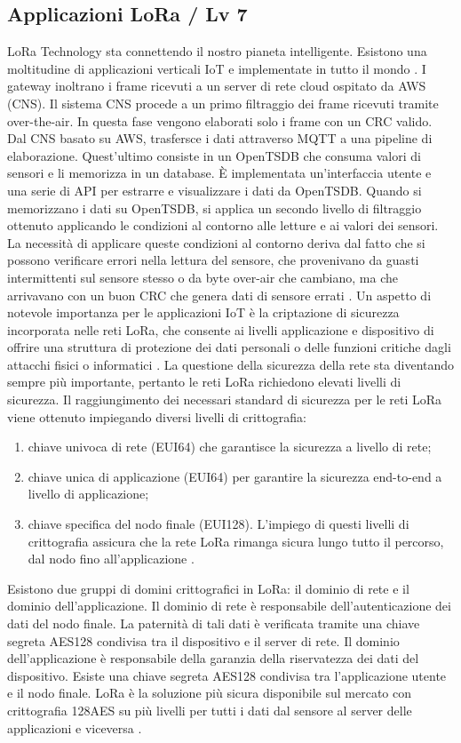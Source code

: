 \documentclass[a4paper]{report} %
\begin{document}
\subsection{Applicazioni LoRa / Lv 7}
LoRa Technology sta connettendo il nostro pianeta intelligente. Esistono una moltitudine di applicazioni verticali IoT e implementate in tutto il mondo \cite{art:rif.24}.
I gateway inoltrano i frame ricevuti a un server di rete cloud ospitato da AWS (CNS). Il sistema CNS procede a un primo filtraggio dei frame ricevuti tramite over-the-air. In questa fase vengono elaborati solo i frame con un CRC valido. Dal CNS basato su AWS, trasfersce i dati attraverso MQTT a una pipeline di elaborazione. Quest'ultimo consiste in un OpenTSDB che consuma valori di sensori e li memorizza in un database. È implementata un'interfaccia utente e una serie di API per estrarre e visualizzare i dati da OpenTSDB. Quando si memorizzano i dati su OpenTSDB, si applica un secondo livello di filtraggio ottenuto applicando le condizioni al contorno alle letture e ai valori dei sensori. La necessità di applicare queste condizioni al contorno deriva dal fatto che si possono verificare errori nella lettura del sensore, che provenivano da guasti intermittenti sul sensore stesso o da byte over-air che cambiano, ma che arrivavano con un buon CRC che genera dati di sensore errati \cite{art:rif.43}.
Un aspetto di notevole importanza per le applicazioni IoT è la criptazione di sicurezza incorporata nelle reti LoRa, che consente ai livelli applicazione e dispositivo di offrire una struttura di protezione dei dati personali o delle funzioni critiche dagli attacchi fisici o informatici \cite{art:rif.20}. 
La questione della sicurezza della rete sta diventando sempre più importante, pertanto le reti LoRa richiedono elevati livelli di sicurezza. Il raggiungimento dei necessari standard di sicurezza per le reti LoRa viene ottenuto impiegando diversi livelli di crittografia:
\begin{enumerate}
\item chiave univoca di rete (EUI64) che garantisce la sicurezza a livello di rete;
\item chiave unica di applicazione (EUI64) per garantire la sicurezza end-to-end a livello di applicazione;
\item chiave specifica del nodo finale (EUI128).
L’impiego di questi livelli di crittografia assicura che la rete LoRa rimanga sicura lungo tutto il percorso, dal nodo fino all’applicazione \cite{art:rif.27}.
\end{enumerate}
Esistono due gruppi di domini crittografici in LoRa: il dominio di rete e il dominio dell'applicazione. Il dominio di rete è responsabile dell'autenticazione dei dati del nodo finale. La paternità di tali dati è verificata tramite una chiave segreta AES128 condivisa tra il dispositivo e il server di rete. Il dominio dell'applicazione è responsabile della garanzia della riservatezza dei dati del dispositivo. Esiste una chiave segreta AES128 condivisa tra l'applicazione utente e il nodo finale. LoRa è la soluzione più sicura disponibile sul mercato con crittografia 128AES su più livelli per tutti i dati dal sensore al server delle applicazioni e viceversa \cite{art:rif.30}.
\end{document}
